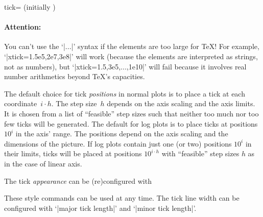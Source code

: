 \begin{pgfplotsxykey}{\x tick= (initially \marg{})%
}
    \paragraph{Attention:}

    You can't use the `|...|' syntax if the elements are too large for \TeX{}!
    For example, `|xtick={1.5e5,2e7,3e8}|' will work (because the elements are
    interpreted as strings, not as numbers), but `|xtick={1.5,3e5,...,1e10}|'
    will fail because it involves real number arithmetics beyond \TeX's
    capacities.
        \vspace*{0.3cm}

    \noindent The default choice for tick \emph{positions} in normal plots is
    to place a tick at each coordinate~$i\cdot h$. The step size~$h$ depends on
    the axis scaling and the axis limits. It is chosen from a list of
    ``feasible'' step sizes such that neither too much nor too few ticks will
    be generated. The default for log plots is to place ticks at positions
    $10^i$ in the axis' range. The positions depend on the axis scaling and the
    dimensions of the picture. If log plots contain just one (or two) positions
    $10^i$ in their limits, ticks will be placed at positions $10^{i\cdot h}$
    with ``feasible'' step sizes $h$ as in the case of linear axis.

    \noindent The tick \emph{appearance} can be (re)configured with
\begin{codeexample}
\end{codeexample}

    These style commands can be used at any time. The tick line width can be
    configured with `|major tick length|' and `|minor tick length|'.
\begin{codeexample}[]
\end{codeexample}

\begin{codeexample}[]
\end{codeexample}
\end{pgfplotsxykey}

